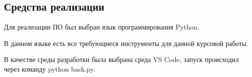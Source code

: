 \subsection{Средства реализации} 

Для реализации ПО был выбран язык программирования Python\cite{python}. 

В данном языке есть все требующиеся инструменты для данной курсовой работы.

В качестве среды разработки была выбрана среда VS Code\cite{vscode}, запуск происходил через команду python back.py.